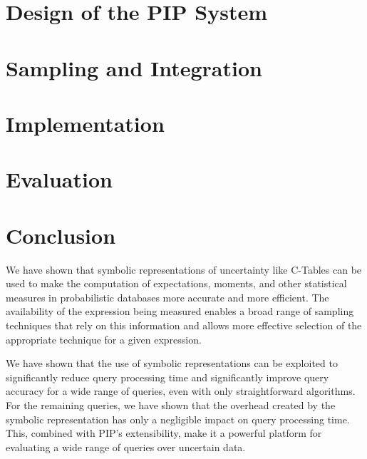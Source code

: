 \documentclass[10pt,conference,letterpaper]{IEEEtran}
\begin{document}
\section{Design of the PIP System}
\label{sec:design}


\section{Sampling and Integration}
\label{sec:sampling}


\section{Implementation}
\label{sec:implementation}


\section{Evaluation}
\label{sec:evaluation}



\section{Conclusion}

We have shown that symbolic representations of uncertainty like C-Tables can be used to make the computation of expectations, moments, and other statistical measures in probabilistic databases more accurate and more efficient.  The availability of the expression being measured enables a broad range of sampling techniques that rely on this information and allows more effective selection of the appropriate technique for a given expression.

We have shown that the use of symbolic representations can be exploited to significantly reduce query processing time and significantly improve query accuracy for a wide range of queries, even with only straightforward algorithms.  For the remaining queries, we have shown that the overhead created by the symbolic representation has only a negligible impact on query processing time.  This, combined with PIP's extensibility, make it a powerful platform for evaluating a wide range of queries over uncertain data.
%
%

\begin{small}
%


\end{small}
\end{document}
